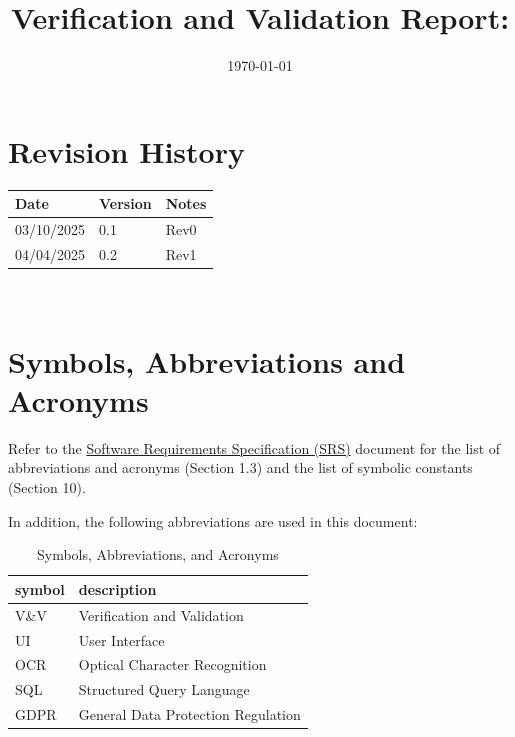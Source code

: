 \documentclass[12pt, titlepage]{article}
\begin{document}
\title{Verification and Validation Report: \progname} 
\author{\authname}
\date{\today}
	
\maketitle


\section{Revision History}

\begin{tabularx}{\textwidth}{p{3cm}p{2cm}X}
\toprule {\bf Date} & {\bf Version} & {\bf Notes}\\
\midrule
03/10/2025 & 0.1 & Rev0\\
04/04/2025 & 0.2 & Rev1\\
\bottomrule
\end{tabularx}

~\newpage

\section{Symbols, Abbreviations and Acronyms}


Refer to the
\href{https://github.com/PlutosCapstone/Plutos/blob/main/docs/SRS/SRS.pdf}{Software
Requirements Specification (SRS)} document for the list of abbreviations and
acronyms (Section 1.3) and the list of symbolic constants (Section 10).


In addition, the following abbreviations are used in this document:\\

\renewcommand{\arraystretch}{1.2}
\begin{table}[h!]
\caption{Symbols, Abbreviations, and Acronyms}
\begin{tabularx}{\textwidth}{l l}
  \toprule		
  \textbf{symbol} & \textbf{description}\\
  \midrule 
  V\&V & Verification and Validation\\
  UI & User Interface\\
  OCR & Optical Character Recognition\\
  SQL & Structured Query Language\\
  GDPR & General Data Protection Regulation\\
  \bottomrule
\end{tabularx}
\end{table}
\end{document}

